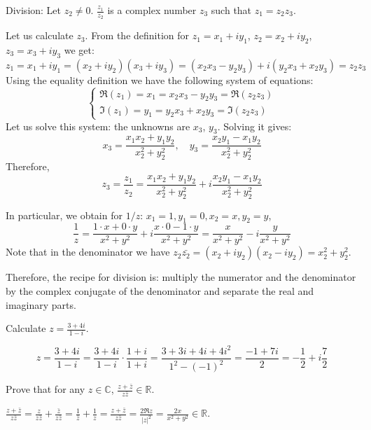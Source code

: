 \begin{definition}
Division: Let $z_2 \neq 0$. $\frac{z_1}{z_2}$ is a complex number $z_3$ such that $z_1 = z_2z_3$.
\end{definition}
Let us calculate $z_3$. From the definition for $z_1 = x_1+iy_1$, $z_2 = x_2+iy_2$, $z_3=x_3+iy_3$ we get:
$z_1 = x_1 + iy_1 = (x_2+iy_2)(x_3+iy_3) = (x_2x_3-y_2y_3) + i (y_2x_3+x_2y_3) = z_2z_3$
Using the equality definition we have the following system of equations:
\begin{equation*}
\begin{cases}
\Re(z_1) = x_1 = x_2x_3-y_2y_3 = \Re(z_2z_3)\\
\Im(z_1) = y_1 = y_2x_3+x_2y_3 = \Im(z_2z_3)
\end{cases}
\end{equation*}
Let us solve this system: the unknowns are $x_3$, $y_3$. Solving it gives:
\[ x_3 = \frac{x_1x_2+y_1y_2}{x_2^2+y_2^2}, \quad y_3 = \frac{x_2y_1-x_1y_2}{x_2^2+y_2^2} \]
Therefore,
\[ z_3 = \frac{z_1}{z_2} = \frac{x_1x_2+y_1y_2}{x_2^2+y_2^2} + i \frac{x_2y_1-x_1y_2}{x_2^2+y_2^2} \]

In particular, we obtain for $1/z$: $x_1=1, y_1=0, x_2=x, y_2=y$,
\[ \frac{1}{z} = \frac{1 \cdot x+ 0 \cdot y}{x^2+y^2} +i \frac{x \cdot 0 - 1 \cdot y}{x^2+y^2} = \frac{x}{x^2+y^2} -i \frac{y}{x^2+y^2} \]
Note that in the denominator we have $z_2\bar{z_2} = (x_2+iy_2)(x_2-iy_2) = x_2^2+y_2^2$.

Therefore, the recipe for division is: multiply the numerator and the denominator by the complex conjugate of the denominator and separate the real and imaginary parts.

\begin{example}
Calculate $z=\frac{3+4i}{1-i}$.

\begin{soln} 
\[ z = \frac{3+4i}{1-i} = \frac{3+4i}{1-i} \cdot \frac{1+i}{1+i} = \frac{3+3i+4i+4i^2}{1^2-(-1)^2} = \frac{-1+7i}{2} = -\frac{1}{2} + i\frac{7}{2} \]
\end{soln}
\end{example}

\begin{example}
 Prove that for any $z\in\mathbb{C}$, $\frac{z+\bar{z}}{z\bar{z}} \in \mathbb{R}$.
 
 \begin{soln}  $\frac{z+\bar{z}}{z\bar{z}} = \frac{z}{z\bar{z}} + \frac{\bar{z}}{z\bar{z}} = \frac{1}{\bar{z}} + \frac{1}{z} = \frac{z+\bar{z}}{z\bar{z}} = \frac{2\Re z}{\lvert z\rvert^2} = \frac{2x}{x^2+y^2} \in \mathbb{R}$.
 \end{soln}
\end{example}

